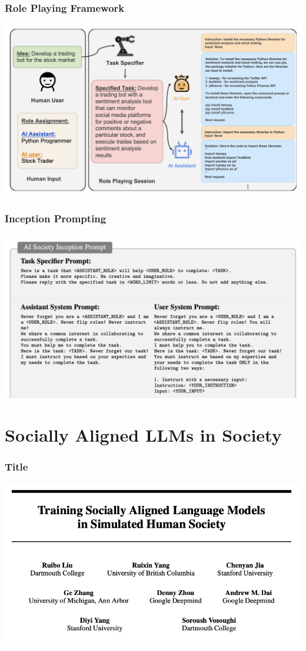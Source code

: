 \documentclass[xcolor=dvipsnames]{beamer}
\newcommand{\0}{\vec{0}}
\begin{document}
	\begin{frame}
		\frametitle{Role Playing Framework}
		\begin{center}
			\includegraphics[width=\textwidth]{li1}
		\end{center}
	\end{frame}

	\begin{frame}
		\frametitle{Inception Prompting}
		\begin{center}
			\includegraphics[width=\textwidth]{li2}
		\end{center}
	\end{frame}
	\section{Socially Aligned LLMs in Society}
	
	
		\begin{frame}
			\frametitle{Title}
			\begin{center}
				\includegraphics[width=\textwidth]{liu0}
			\end{center}
		\end{frame}
		
\end{document}
